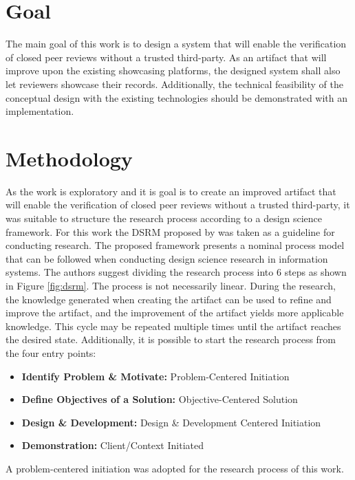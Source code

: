 \section{Goal}

The main goal of this work is to design a system that will enable the verification of closed peer reviews without a trusted third-party. As an artifact that will improve upon the existing showcasing platforms, the designed system shall also let reviewers showcase their records. Additionally, the technical feasibility of the conceptual design with the existing technologies should be demonstrated with an implementation. 

\section{Methodology}

As the work is exploratory and it is goal is to create an improved artifact that will enable the verification of closed peer reviews without a trusted third-party, it was suitable to structure the research process according to a design science framework. For this work the \acrfull{DSRM} proposed by \cite{Peffers.2007} was taken as a guideline for conducting research. The proposed framework presents a nominal process model that can be followed when conducting design science research in information systems. The authors suggest dividing the research process into 6 steps as shown in Figure \ref{fig:dsrm}. The process is not necessarily linear. During the research, the knowledge generated when creating the artifact can be used to refine and improve the artifact, and the improvement of the artifact yields more applicable knowledge. This cycle may be repeated multiple times until the artifact reaches the desired state. Additionally, it is possible to start the research process from the four entry points:

\begin{itemize}
    \item \textbf{Identify Problem \& Motivate:} Problem-Centered Initiation
    \item \textbf{Define Objectives of a Solution:} Objective-Centered Solution
    \item \textbf{Design \& Development:} Design \& Development Centered Initiation
    \item \textbf{Demonstration:} Client/Context Initiated
\end{itemize}

A problem-centered initiation was adopted for the research process of this work. 


